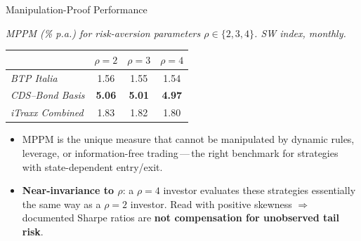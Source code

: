 \documentclass[aspectratio=169,11pt]{beamer}
\newcommand{\hlt}[1]{\textcolor{edhecred}{\textbf{#1}}}     %
\newcommand{\hltb}[1]{\textcolor{accentblue}{\textbf{#1}}}  %
\begin{document}
\begin{frame}[t]{Manipulation-Proof Performance \citep{goetzmann2007portfolio}}
\centering
\small
\vspace{0.10cm}

\textit{MPPM (\% p.a.) for risk-aversion parameters $\rho \in \{2,3,4\}$. SW index, monthly.}

\vspace{0.20cm}
\renewcommand{\arraystretch}{1.25}
\setlength{\tabcolsep}{12pt}

\begin{tabular}{lccc}
\toprule
 & $\rho=2$ & $\rho=3$ & $\rho=4$ \\
\midrule
\textit{BTP Italia}      & 1.56 & 1.55 & 1.54 \\
\textit{CDS--Bond Basis} & \hlt{5.06} & \hlt{5.01} & \hlt{4.97} \\
\textit{iTraxx Combined} & 1.83 & 1.82 & 1.80 \\
\bottomrule
\end{tabular}

\vspace{0.50cm}

\begin{itemize}\itemsep=0.10cm\small
  \item MPPM is the unique measure that cannot be manipulated by dynamic
        rules, leverage, or information-free trading\,---\,the right
        benchmark for strategies with state-dependent entry/exit.
  \item \hlt{Near-invariance to $\rho$}: a $\rho=4$ investor evaluates these
        strategies essentially the same way as a $\rho=2$ investor.
        Read with positive skewness $\Rightarrow$ documented Sharpe
        ratios are \hltb{not compensation for unobserved tail risk}.
\end{itemize}

\end{frame}
\end{document}

